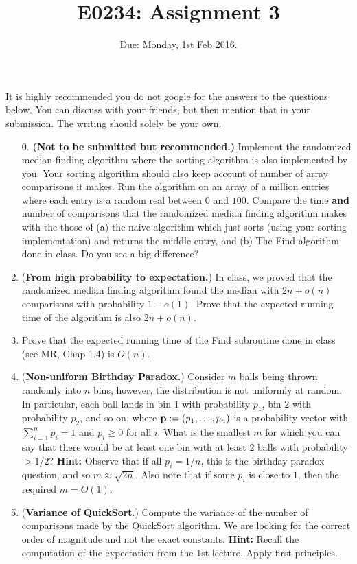 \documentclass[11pt]{article}
\begin{document}
\title{E0234: Assignment 3}
\author{}
\date{Due: Monday, 1st Feb 2016.}
\maketitle
It is highly recommended you do not google for the answers to the questions below. You can discuss with your friends, but then mention that in your submission.
The writing should solely be your own.

\begin{enumerate}
\item[0.] {\bf (Not to be submitted but recommended.)} Implement the randomized median finding algorithm where the sorting algorithm is also implemented by you. 
Your sorting algorithm should also keep account of number of array comparisons it makes. Run the algorithm 
on an array of a million entries where each entry is a random real between $0$ and $100$. 
Compare the time {\bf and} number of comparisons that the randomized median finding algorithm 
makes with the those of (a) the naive algorithm which just sorts (using your sorting implementation) and returns the middle entry, and (b) The Find algorithm done in class.
Do you see a big difference?

\item ({\bf From high probability to expectation.}) In class, we proved that the randomized median finding algorithm found the median with $2n + o(n)$ comparisons with probability $1 - o(1)$.
Prove that the expected running time of the algorithm is also $2n + o(n)$.

\item Prove that the expected running time of the Find subroutine done in class (see MR, Chap 1.4) is $O(n)$.

\item ({\bf Non-uniform Birthday Paradox.}) Consider $m$ balls being thrown randomly into $n$ bins, however, the distribution is not uniformly at random.
In particular, each ball lands in bin $1$ with probability $p_1$, bin $2$ with probability $p_2$, and so on, where 
${\bf p} := (p_1,\ldots,p_n)$ is a probability vector with $\sum_{i=1}^n p_i = 1$ and $p_i \geq 0$ for all $i$. What is the smallest $m$ for which you can say that 
there would be at least one bin with at least $2$ balls with probability $>1/2$?
{\bf Hint:} Observe that if all $p_i = 1/n$, this is the birthday paradox question, and so $m \approx \sqrt{2n}$. Also note that if some $p_i$ is close to $1$, then the required $m = O(1)$.


\item  ({\bf Variance of QuickSort}.) 
Compute the variance of the number of comparisons made by the QuickSort algorithm. We are looking for the correct order of magnitude and not the exact constants.
{\bf Hint:} Recall the computation of the expectation from the 1st lecture. Apply first principles.

\end{enumerate}
\end{document}
